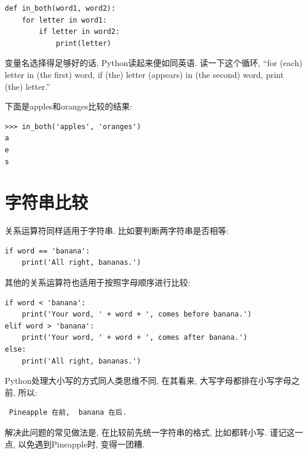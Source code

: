 \documentclass[10pt]{book}
\begin{document}
\begin{verbatim}
def in_both(word1, word2):
    for letter in word1:
        if letter in word2:
            print(letter)
\end{verbatim}
%

变量名选择得足够好的话, Python读起来便如同英语. 
读一下这个循环, ``for (each) letter in (the first) word, if (the) letter 
(appears) in (the second) word, print (the) letter.''

下面是apples和oranges比较的结果:

\begin{verbatim}
>>> in_both('apples', 'oranges')
a
e
s
\end{verbatim}
%

\section{字符串比较}

关系运算符同样适用于字符串. 
比如要判断两字符串是否相等:

\begin{verbatim}
if word == 'banana':
    print('All right, bananas.')
\end{verbatim}
%
其他的关系运算符也适用于按照字母顺序进行比较:

\begin{verbatim}
if word < 'banana':
    print('Your word, ' + word + ', comes before banana.')
elif word > 'banana':
    print('Your word, ' + word + ', comes after banana.')
else:
    print('All right, bananas.')
\end{verbatim}
%
Python处理大小写的方式同人类思维不同, 在其看来, 大写字母都排在小写字母之前, 
所以:

\begin{verbatim}
 Pineapple 在前,  banana 在后.
\end{verbatim}
%
解决此问题的常见做法是, 在比较前先统一字符串的格式, 比如都转小写. 
谨记这一点, 以免遇到Pineapple时, 变得一团糟. 
\end{document}
